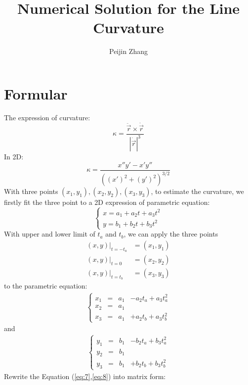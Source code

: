 \documentclass{article}
\title{Numerical Solution for the Line Curvature}
\author{Peijin Zhang}
\begin{document}
	\maketitle
	\section{Formular}
	The expression of curvature:
	\begin{equation}
	\kappa = \frac{\ddot{\vec{r}}\times\dot{\vec{r}}}{\left| \dot{\vec{r}}\right|^3}
	\end{equation}
	In 2D:
	\begin{equation}
	\kappa = \frac{x''y'-x'y''}{\left( (x')^2+(y')^2\right)^{3/2}}
	\end{equation}
	With three points $(x_1,y_1), (x_2,y_2), (x_3,y_3)$, to estimate the curvature, we firstly fit the three point to a 2D expression of parametric equation:
	\begin{equation}
	\left\{ \begin{matrix} x = a_1 +a_2 t+a_3 t^2\\ y= b_1 +b_2 t+b_3 t^2 \end{matrix} \right.
	\end{equation}
	With upper and lower limit of $t_a$ and $t_b$, we can apply the three points
	\begin{align}
	(x,y)|_{t=-t_a} &= (x_1,y_1)\\ (x,y)|_{t=0} &= (x_2,y_2)\\ (x,y)|_{t=t_b} &= (x_3,y_3)
	\end{align}
	 to the parametric equation:
	 \begin{align}
	 \left\{ \begin{matrix} x_1 &= & a_1 &- a_2 t_a +a_3 t_a^2\\ x_2 &= &a_1 &\\ x_3 &= &a_1 &+ a_2 t_b + a_3 t_b^2 \end{matrix} \right.
	 \label{eq:7}
	 \end{align}
	 and
	 \begin{align}
	 \left\{ \begin{matrix} y_1 &= & b_1 &- b_2 t_a + b_3 t_a^2\\ y_2 &= &b_1 &\\ y_3 &= &b_1 &+ b_2 t_b + b_3 t_b^2 \end{matrix} \right.
	 \label{eq:8}
	 \end{align}
	 Rewrite the Equation (\ref{eq:7},\ref{eq:8}) into matrix form:
\end{document}
